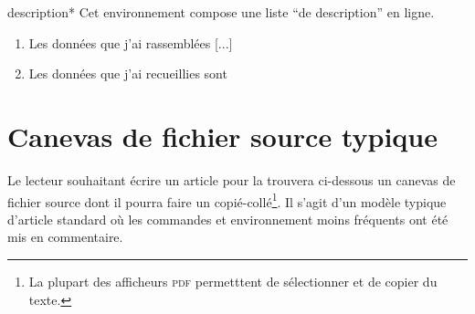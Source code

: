\begin{docEnvironment}[doclang/environment content=liste]{description*}{}
  Cet environnement compose une liste \enquote{de description} en ligne.
\end{docEnvironment}

\begin{bodycode}[listing and text,listing options={deletekeywords={[1]math,[2]url}}]
\begin{enumerate}
\item Les données que j'ai rassemblées [...]
\item Les données que j'ai recueillies sont
\end{enumerate}
\end{bodycode}

\section{Canevas de fichier source typique}
\label{sec-canevas-de-fichier}

Le lecteur souhaitant écrire un article pour la \gzt*{} trouvera ci-dessous un
canevas de fichier source dont il pourra faire un copié-collé\footnote{La
  plupart des afficheurs \textsc{pdf} permetttent de sélectionner et de copier
  du texte.}. Il s'agit d'un modèle typique d'article standard où les commandes
et environnement moins fréquents ont été mis en commentaire.


\iffalse
\fi
